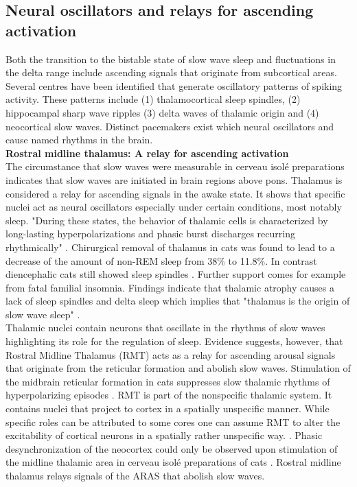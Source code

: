 \subsection{Neural oscillators and relays for ascending activation}
\label{ascending_system_and_oscillators}
Both the transition to the bistable state of slow wave sleep and fluctuations in the delta range include ascending signals that originate from subcortical areas. Several centres have been identified that generate oscillatory patterns of spiking activity. These patterns include (1) thalamocortical sleep spindles, (2) hippocampal sharp wave ripples (3) delta waves of thalamic origin and (4) neocortical slow waves. Distinct pacemakers exist which neural oscillators and cause named rhythms in the brain.\\

\textbf{Rostral midline thalamus: A relay for ascending activation}\\
The circumstance that slow waves were measurable in cerveau isolé preparations indicates that slow waves are initiated in brain regions above pons. Thalamus is considered a relay for ascending signals in the awake state. It shows that specific nuclei act as neural oscillators especially under certain conditions, most notably sleep. "During these states, the behavior of thalamic cells is characterized by long-lasting hyperpolarizations and phasic burst discharges recurring rhythmically" \parencite[p. 21]{steriade1984thalamus}. Chirurgical removal of thalamus in cats was found to lead to a decrease of the amount of non-REM sleep from 38\% to 11.8\%. In contrast diencephalic cats still showed sleep spindles \parencite{montagna2005fatal}. Further support comes for example from fatal familial insomnia. Findings indicate that thalamic atrophy causes a lack of sleep spindles and delta sleep which implies that "thalamus is the origin of slow wave sleep" \parencite[p. 339]{montagna2005fatal}.\\
Thalamic nuclei contain neurons that oscillate in the rhythms of slow waves highlighting its role for the regulation of sleep. Evidence suggests, however, that Rostral Midline Thalamus (RMT) acts as a relay for ascending arousal signals that originate from the reticular formation and abolish slow waves. Stimulation of the midbrain reticular formation in cats suppresses slow thalamic rhythms of hyperpolarizing episodes \parencite{steriade1984thalamus}. RMT is part of the nonspecific thalamic system. It contains nuclei that project to cortex in a spatially unspecific manner. While specific roles can be attributed to some cores one can assume RMT to alter the excitability of cortical neurons in a spatially rather unspecific way. \parencite{vertes2015limbic}. Phasic desynchronization of the neocortex could only be observed upon stimulation of the midline thalamic area in cerveau isolé preparations of cats \parencite{kawamura1968hippocampal}. Rostral midline thalamus relays signals of the ARAS that abolish slow waves.\\

